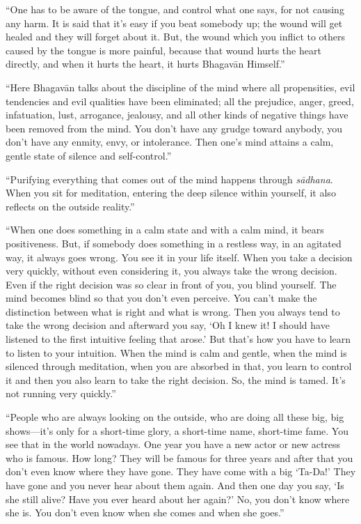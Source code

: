 \enquote{One has to be aware of the tongue, and control what one says, for not causing any harm. It is said that it’s easy if you beat somebody up; the wound will get healed and they will forget about it. But, the wound which you inflict to others caused by the tongue is more painful, because that wound hurts the heart directly, and when it hurts the heart, it hurts Bhagavān Himself.}

\enquote{Here Bhagavān talks about the discipline of the mind where all propensities, evil tendencies and evil qualities have been eliminated; all the prejudice, anger, greed, infatuation, lust, arrogance, jealousy, and all other kinds of negative things have been removed from the mind. You don’t have any grudge toward anybody, you don’t have any enmity, envy, or intolerance. Then one’s mind attains a calm, gentle state of silence and self-control.}

\enquote{Purifying everything that comes out of the mind happens through \textit{sādhana}. When you sit for meditation, entering the deep silence within yourself, it also reflects on the outside reality.}

\enquote{When one does something in a calm state and with a calm mind, it bears positiveness. But, if somebody does something in a restless way, in an agitated way, it always goes wrong. You see it in your life itself. When you take a decision very quickly, without even considering it, you always take the wrong decision. Even if the right decision was so clear in front of you, you blind yourself. The mind becomes blind so that you don’t even perceive. You can’t make the distinction between what is right and what is wrong. Then you always tend to take the wrong decision and afterward you say, \enquote{Oh I knew it! I should have listened to the first intuitive feeling that arose.} But that’s how you have to learn to listen to your intuition. When the mind is calm and gentle, when the mind is silenced through meditation, when you are absorbed in that, you learn to control it and then you also learn to take the right decision. So, the mind is tamed. It’s not running very quickly.}

\enquote{People who are always looking on the outside, who are doing all these big, big shows---it’s only for a short-time glory, a short-time name, short-time fame. You see that in the world nowadays. One year you have a new actor or new actress who is famous. How long? They will be famous for three years and after that you don’t even know where they have gone. They have come with a big \enquote{Ta-Da!} They have gone and you never hear about them again. And then one day you say, \enquote{Is she still alive? Have you ever heard about her again?} No, you don’t know where she is. You don’t even know when she comes and when she goes.}


